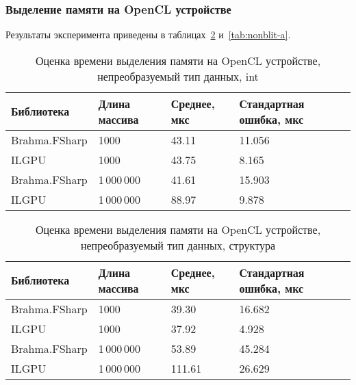 \subsubsection{Выделение памяти на OpenCL устройстве}
Результаты эксперимента приведены в таблицах~\ref{tab:blit-a} и~\ref{tab:nonblit-a}.

\begin{table}
    \begin{tabularx}{\textwidth}{|X|X|X|X|}
      \hline
      \textbf{Библиотека} & \textbf{Длина массива} & \textbf{Среднее, мкс} & \textbf{Стандартная ошибка, мкс} \\
      \hline
      Brahma.FSharp & 1000 & 43.11  & 11.056   \\
      ILGPU & 1000 & 43.75  & 8.165  \\
      \hline
      Brahma.FSharp & 1\,000\,000 & 41.61  & 15.903   \\
      ILGPU & 1\,000\,000 & 88.97   & 9.878  \\
      \hline
    \end{tabularx}
  \caption{Оценка времени выделения памяти на OpenCL устройстве, непреобразуемый тип данных, int}
  \label{tab:blit-a}
\end{table}

\begin{table}
    \begin{tabularx}{\textwidth}{|X|X|X|X|}
      \hline
      \textbf{Библиотека} & \textbf{Длина массива} & \textbf{Среднее, мкс} & \textbf{Стандартная ошибка, мкс} \\
      \hline
      Brahma.FSharp & 1000 & 39.30  & 16.682    \\
      ILGPU & 1000 & 37.92  & 4.928  \\
      \hline
      Brahma.FSharp & 1\,000\,000 & 53.89   & 45.284   \\
      ILGPU & 1\,000\,000 & 111.61  & 26.629   \\
      \hline
    \end{tabularx}
  \caption{Оценка времени выделения памяти на OpenCL устройстве, непреобразуемый тип данных, структура}
  \label{tab:blit-a}
\end{table}


